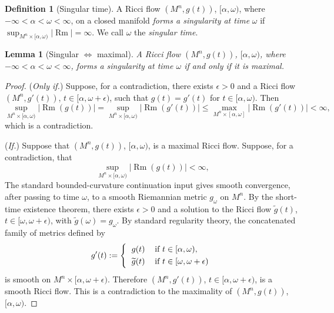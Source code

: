 \documentclass[11pt]{article}
\theoremstyle{plain}
\newtheorem{lemma}[theorem]{Lemma}
\theoremstyle{definition}
\newtheorem{definition}[theorem]{Definition}
\theoremstyle{remark}
\newcommand{\Rm}{\operatorname{Rm}}
\begin{document}
\begin{definition}[Singular time]
    A Ricci flow $(M^n,g(t))$, $[\alpha,\omega)$, where $-\infty < \alpha < \omega < \infty$, on a closed manifold \emph{forms a singularity at time} $\omega$ if $\sup_{M^n\times [\alpha,\omega) } |\Rm| = \infty$.
    We call $\omega$ the \emph{singular time}.
\end{definition}

\begin{lemma}[Singular $\Leftrightarrow$ maximal]
\label{lem: sing time iff max time}
    A Ricci flow $(M^n,g(t))$, $[\alpha,\omega)$, where $-\infty < \alpha < \omega < \infty$, forms a singularity at time $\omega$ if and only if it is maximal.
\end{lemma}

\begin{proof}
(\emph{Only if.})
    Suppose, for a contradiction, there exists $\epsilon >0$ and a Ricci flow $(M^n,g'(t))$, $t\in [\alpha,\omega+\epsilon)$, such that $g(t)=g'(t)$ for $t\in [\alpha,\omega)$.
Then
\begin{equation}
    \sup_{M^n\times [\alpha,\omega) } |\Rm(g(t))|
= \sup_{M^n\times [\alpha,\omega) } |\Rm(g'(t))| \leq \max_{M^n\times [\alpha,\omega] } |\Rm(g'(t))| < \infty ,
\end{equation}
which is a contradiction.\smallskip 

(\emph{If.})
Suppose that $(M^n,g(t))$, $[\alpha,\omega)$, is a maximal Ricci flow.
Suppose, for a contradiction, that 
\begin{equation}
    \sup_{M^n\times [\alpha,\omega) } |\Rm(g(t))| < \infty ,
\end{equation}
The standard bounded-curvature continuation input gives smooth convergence,
after passing to time $\omega$, to a smooth Riemannian metric $g_\omega$ on
$M^n$.  By the short-time existence theorem, there exists $\epsilon>0$ and a
solution to the Ricci flow $\widetilde{g}(t)$,
$t\in [\omega,\omega+\epsilon)$, with $\widetilde{g}(\omega)=g_\omega$.
By standard regularity theory, the concatenated family of metrics defined by
\begin{equation}
    g'(t) := \left\{ 
    \begin{tabular}{cl}
        $g(t)$ & if $t\in [\alpha , \omega)$,\smallskip \\
        $\widetilde{g}(t)$ & if $t\in [\omega, \omega+\epsilon)$ 
    \end{tabular}
    \right. 
\end{equation}
is smooth on $M^n \times [\alpha , \omega +\epsilon)$.
Therefore $(M^n,g'(t))$, $t\in [\alpha, \omega+\epsilon)$, is a smooth Ricci flow.
This is a contradiction to the maximality of $(M^n,g(t))$, $[\alpha,\omega)$.
\end{proof}
\end{document}
